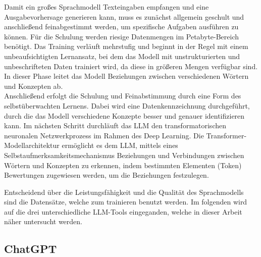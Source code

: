 Damit ein großes Sprachmodell Texteingaben empfangen und eine Ausgabevorhersage generieren kann, muss es zunächst 
allgemein geschult und anschließend feinabgestimmt werden, um spezifische Aufgaben ausführen zu können. Für die 
Schulung werden riesige Datenmengen im Petabyte-Bereich benötigt. Das Training verläuft mehrstufig und beginnt in 
der Regel mit einem unbeaufsichtigten Lernansatz, bei dem das Modell mit unstrukturierten und unbeschrifteten Daten 
trainiert wird, da diese in größeren Mengen verfügbar sind. In dieser Phase leitet das Modell Beziehungen zwischen 
verschiedenen Wörtern und Konzepten ab.\\
Anschließend erfolgt die Schulung und Feinabstimmung durch eine Form des selbstüberwachten Lernens. Dabei wird eine 
Datenkennzeichnung durchgeführt, durch die das Modell verschiedene Konzepte besser und genauer identifizieren kann. 
Im nächsten Schritt durchläuft das LLM den transformatorischen neuronalen Netzwerkprozess im Rahmen des Deep Learning. 
Die Transformer-Modellarchitektur ermöglicht es dem LLM, mittels eines Selbstaufmerksamkeitsmechanismus Beziehungen 
und Verbindungen zwischen Wörtern und Konzepten zu erkennen, indem bestimmten Elementen (Token) Bewertungen zugewiesen 
werden, um die Beziehungen festzulegen.

Entscheidend über die Leistungsfähigkeit und die Qualität des Sprachmodells sind die Datensätze, welche zum trainieren
benutzt werden. Im folgenden wird auf die drei unterschiedliche LLM-Tools eingeganden, welche in dieser Arbeit näher 
untersucht werden\cite{GrundlagenLLM}. 

\subsection{ChatGPT}  \label{ChatGPT}

